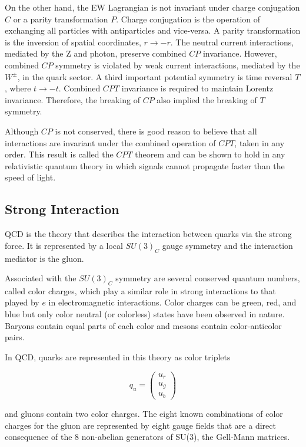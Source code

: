 On the other hand, the EW Lagrangian is not invariant under charge conjugation $C$ or a parity transformation $P$. Charge conjugation is the operation of exchanging all particles with antiparticles and vice-versa. A parity transformation is the inversion of spatial coordinates, $r\rightarrow -r$. The neutral current interactions, mediated by the Z and photon, preserve combined $CP$ invariance. However, combined $CP$ symmetry is violated by weak current interactions, mediated by the $W^{\pm}$, in the quark sector. A third important potential symmetry is time reversal $T$, where $t\rightarrow -t$. Combined $CPT$ invariance is required to maintain Lorentz invariance. Therefore, the breaking of $CP$ also implied the breaking of $T$ symmetry.

Although $CP$ is not conserved, there is good reason to believe that all interactions are invariant under the combined operation of $CPT$, taken in any order. This result is called the $CPT$ theorem\cite{PhysRev.82.914} and can be shown to hold in any relativistic quantum theory in which signals cannot propagate faster than the speed of light.

\subsection{Strong Interaction}

QCD is the theory that describes the interaction between quarks via the strong force. It is represented by a local $SU(3)_{C}$ gauge symmetry and the interaction mediator is the gluon.

Associated with the $SU(3)_{C}$ symmetry are several conserved quantum numbers, called color charges, which play a similar role in strong interactions to that played by $e$ in electromagnetic interactions. Color charges can be green, red, and blue but only color neutral (or colorless) states have been observed in nature. Baryons contain equal parts of each color and mesons contain color-anticolor pairs.

In QCD, quarks are represented in this theory as color triplets

	\begin{equation}
	q_{u} = 
	\begin{pmatrix}
		u_{r} \\
		u_{g}\\
		u_{b}
	\end{pmatrix}
	\end{equation}

and gluons contain two color charges. The eight known combinations of color charges for the gluon are represented by eight gauge fields that are a direct consequence of the 8 non-abelian generators of SU(3), the Gell-Mann matrices\cite{Cheng:1985bj}.

